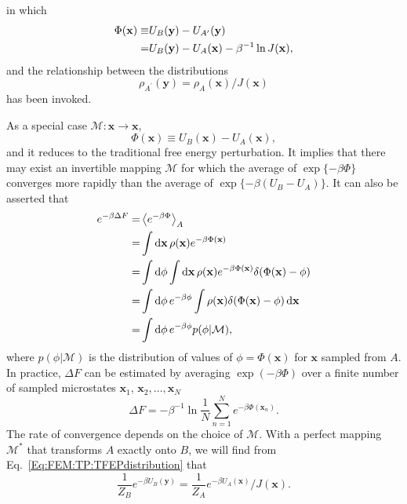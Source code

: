 in which 
\begin{align}
	\Phi(\mathbf{x})\equiv& U_B(\mathbf{y}) - U_{A^\prime}(\mathbf{y})\notag\\
	=&U_B(\mathbf{y})-U_A(\mathbf{x})-\beta^{-1}\ln J(\mathbf{x}),
	\label{Eq:FEM:TP:TFEPPhi}
\end{align}
and the relationship between the distributions
\begin{equation}
	\rho_{A^\prime}(\mathbf{y})=\rho_{A}(\mathbf{x})/J(\mathbf{x})
	\label{Eq:FEM:TP:TFEPdistribution}
\end{equation}
has been invoked.

As a special case $\mathcal{M}: \mathbf{x} \to\mathbf{x}$,
\begin{equation}
	\Phi(\mathbf{x})\equiv U_B(\mathbf{x})-U_A(\mathbf{x}),
\end{equation}
and it reduces to the traditional free energy perturbation. It implies that there may exist an invertible mapping $\mathcal{M}$ for which the average of $\exp\{-\beta \Phi\}$ converges more rapidly than the average of $\exp\{-\beta (U_B-U_A)\}$. It can also be asserted that
\begin{align}
	e^{-\beta \Delta F}=&\left<e^{-\beta \Phi}\right>_A\notag\\
	=&\int \mathop{}\!\mathrm{d} \mathbf{x}\, \rho(\mathbf{x})e^{-\beta \Phi(\mathbf{x})}\notag\\
	=&\int \mathop{}\!\mathrm{d}\phi \int \mathop{}\!\mathrm{d} \mathbf{x}\, \rho(\mathbf{x})e^{-\beta \Phi(\mathbf{x})}\delta(\Phi(\mathbf{x})-\phi)\notag\\
	=&\int \mathop{}\!\mathrm{d}\phi\, e^{-\beta \phi}\int \rho(\mathbf{x})\delta(\Phi(\mathbf{x})-\phi)\mathop{}\!\mathrm{d} \mathbf{x}\notag\\
	=&\int \mathop{}\!\mathrm{d}\phi\, e^{-\beta \phi} p(\phi|\mathcal{M}),
\end{align}
where $p(\phi|\mathcal{M})$ is the distribution of values of $\phi=\Phi(\mathbf{x})$ for $\mathbf{x}$ sampled from $A$. In practice, $\Delta F$ can be estimated by averaging $\exp{(-\beta \Phi)}$ over a finite number of sampled microstates $\mathbf{x}_1,\,\mathbf{x}_2,\dots,\mathbf{x}_N$
\begin{equation}
	\Delta F=-\beta^{-1}\ln\frac{1}{N}\sum_{n=1}^N e^{-\beta \Phi(\mathbf{x}_n)}.
\end{equation}
The rate of convergence depends on the choice of $\mathcal{M}$. With a perfect mapping $\mathcal{M}^\ast$ that transforms $A$ exactly onto $B$, we will find from Eq.~\ref{Eq:FEM:TP:TFEPdistribution} that
\begin{equation}
	\frac{1}{Z_B}e^{-\beta U_B(\mathbf{y})}=\frac{1}{Z_A}e^{-\beta U_A(\mathbf{x})}/J(\mathbf{x}).
\end{equation}
